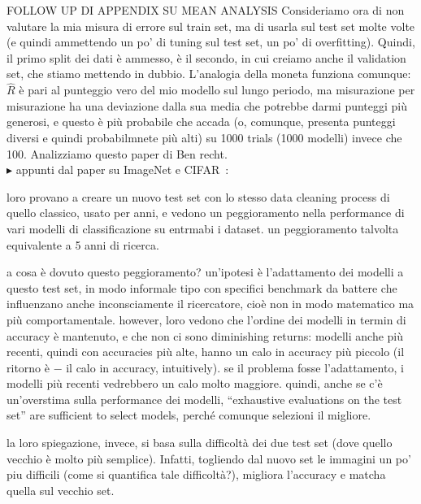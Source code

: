 FOLLOW UP DI APPENDIX SU MEAN ANALYSIS
Consideriamo ora di non valutare la mia misura di errore sul train set, ma di usarla sul test set molte volte (e quindi ammettendo un po' di tuning sul test set, un po' di overfitting). 
Quindi, il primo split dei dati è ammesso, è il secondo, in cui creiamo anche il validation set, che stiamo mettendo in dubbio. L'analogia della moneta funziona comunque: $\hat R$ è pari al punteggio vero del mio modello sul lungo periodo, ma misurazione per misurazione ha una deviazione dalla sua media che potrebbe darmi punteggi più generosi, e questo è più probabile che accada (o, comunque, presenta punteggi diversi e quindi probabilmnete più alti) su 1000 trials (1000 modelli) invece che 100. Analizziamo questo paper di Ben recht. 
\\

\noindent $\blacktriangleright$ appunti dal paper su ImageNet e CIFAR~\cite{recht2019imagenet}:

loro provano a  creare un nuovo test set con lo stesso data cleaning process di quello classico, usato per anni, e vedono un peggioramento nella performance di vari modelli di classificazione su entrmabi i dataset. un peggioramento talvolta equivalente a 5 anni di ricerca. 

a cosa è dovuto questo peggioramento? un'ipotesi è l'adattamento dei modelli a questo test set, in modo informale tipo con specifici benchmark da battere che influenzano anche inconsciamente il ricercatore, cioè non in modo matematico ma più comportamentale. however, loro vedono che l'ordine dei modelli in termin di accuracy è mantenuto, e che non ci sono diminishing returns: modelli anche più recenti, quindi con accuracies più alte, hanno un calo in accuracy più piccolo (il ritorno è $-$ il calo in accuracy, intuitively). se il problema fosse l'adattamento, i modelli più recenti vedrebbero un calo molto maggiore. quindi, anche se c'è un'overstima sulla performance dei modelli, ``exhaustive evaluations on the test set'' are sufficient to select models, perché comunque selezioni il migliore. 

la loro spiegazione, invece, si basa sulla difficoltà dei due test set (dove quello vecchio è molto più semplice). Infatti, togliendo dal nuovo set le immagini un po' piu difficili (come si quantifica tale difficoltà?), migliora l'accuracy e matcha quella sul vecchio set. 


